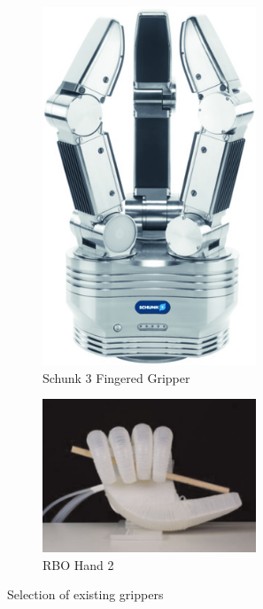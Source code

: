 \begin{figure}
\begin{subfigure}{.3\linewidth}
    \includegraphics[width=0.7\textwidth]{Images/Schunk3FingeredGripper.jpg}
        \caption[Schunk 3 Fingered Gripper]{Schunk 3 Fingered Gripper \cite{Schunk3FingerGripper}}
        \label{fig:Schunk3FingeredGripper}
    \end{subfigure}
    \begin{subfigure}{.3\linewidth}
        \centering
        \includegraphics[width=0.7\textwidth]{Images/SoftRoboticGripper.png}
        \caption[RBO Hand 2]{RBO Hand 2 \cite{RBOHand2}}
        \label{fig:RBOHand2}
    \end{subfigure}
    \caption{Selection of existing grippers}
\end{figure}

